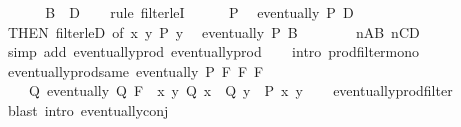 \begin{isabellebody}
\ \ \isamarkupfalse%
\isanewline
\isanewline
\ \ \isamarkupfalse%
\ {\isachardoublequoteopen}B\ {\isasymle}\ D{\isachardoublequoteclose}\isanewline
\ \ \isamarkupfalse%
\ {\isacharparenleft}{\kern0pt}rule\ filter{\isacharunderscore}{\kern0pt}leI{\isacharparenright}{\kern0pt}\isanewline
\ \ \ \ \isamarkupfalse%
\ P\ \isamarkupfalse%
\ {\isachardoublequoteopen}eventually\ P\ D{\isachardoublequoteclose}\ \isamarkupfalse%
\ {\isacharasterisk}{\kern0pt}{\isacharbrackleft}{\kern0pt}THEN\ filter{\isacharunderscore}{\kern0pt}leD{\isacharcomma}{\kern0pt}\ of\ {\isachardoublequoteopen}{\isasymlambda}{\isacharparenleft}{\kern0pt}x{\isacharcomma}{\kern0pt}\ y{\isacharparenright}{\kern0pt}{\isachardot}{\kern0pt}\ P\ y{\isachardoublequoteclose}{\isacharbrackright}{\kern0pt}\ \isamarkupfalse%
\ {\isachardoublequoteopen}eventually\ P\ B{\isachardoublequoteclose}\isanewline
\ \ \ \ \ \ \isamarkupfalse%
\ nAB\ nCD\ \isamarkupfalse%
\ {\isacharparenleft}{\kern0pt}simp\ add{\isacharcolon}{\kern0pt}\ eventually{\isacharunderscore}{\kern0pt}prod{}\ eventually{\isacharunderscore}{\kern0pt}prod{}{\isacharparenright}{\kern0pt}\isanewline
\ \ \isamarkupfalse%
\isanewline
{}\isamarkupfalse%
\ {\isacharparenleft}{\kern0pt}intro\ prod{\isacharunderscore}{\kern0pt}filter{\isacharunderscore}{\kern0pt}mono{\isacharparenright}{\kern0pt}%
\endisatagproof
{\isafoldproof}%
%
\isadelimproof
\isanewline
%
\endisadelimproof
\isanewline
{}\isamarkupfalse%
\ eventually{\isacharunderscore}{\kern0pt}prod{\isacharunderscore}{\kern0pt}same{\isacharcolon}{\kern0pt}\ {\isachardoublequoteopen}eventually\ P\ {\isacharparenleft}{\kern0pt}F\ {\isasymtimes}\isactrlsub F\ F{\isacharparenright}{\kern0pt}\ {\isasymlongleftrightarrow}\isanewline
\ \ \ \ {\isacharparenleft}{\kern0pt}{\isasymexists}Q{\isachardot}{\kern0pt}\ eventually\ Q\ F\ {\isasymand}\ {\isacharparenleft}{\kern0pt}{\isasymforall}x\ y{\isachardot}{\kern0pt}\ Q\ x\ {\isasymlongrightarrow}\ Q\ y\ {\isasymlongrightarrow}\ P\ {\isacharparenleft}{\kern0pt}x{\isacharcomma}{\kern0pt}\ y{\isacharparenright}{\kern0pt}{\isacharparenright}{\kern0pt}{\isacharparenright}{\kern0pt}{\isachardoublequoteclose}\isanewline
%
\isadelimproof
\ \ %
\endisadelimproof
%
\isatagproof
{}\isamarkupfalse%
\ eventually{\isacharunderscore}{\kern0pt}prod{\isacharunderscore}{\kern0pt}filter\ \isamarkupfalse%
\ {\isacharparenleft}{\kern0pt}blast\ intro{\isacharbang}{\kern0pt}{\isacharcolon}{\kern0pt}\ eventually{\isacharunderscore}{\kern0pt}conj{\isacharparenright}{\kern0pt}%

\end{isabellebody}
